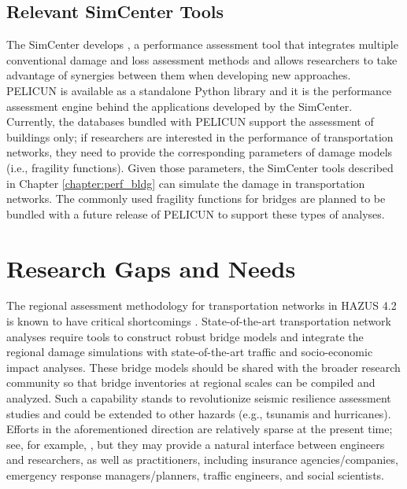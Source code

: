 \subsection{Relevant SimCenter Tools}

The SimCenter develops , a performance assessment tool that integrates multiple conventional damage and loss assessment methods and allows researchers to take advantage of synergies between them when developing new approaches. PELICUN is available as a standalone Python library and it is the performance assessment engine behind the applications developed by the SimCenter. Currently, the databases bundled with PELICUN support the assessment of buildings only; if researchers are interested in the performance of transportation networks, they need to provide the corresponding parameters of damage models (i.e., fragility functions). Given those parameters, the SimCenter tools described in Chapter \ref{chapter:perf_bldg} can simulate the damage in transportation networks. The commonly used fragility functions for bridges are planned to be bundled with a future release of PELICUN to support these types of analyses.

\section{Research Gaps and Needs}
\label{sec:perf_transport_gaps}

The regional assessment methodology for transportation networks in HAZUS 4.2 is known to have critical shortcomings \citep[e.g.][]{mangalathu2017bridge}. State-of-the-art transportation network analyses require tools to construct robust bridge models and integrate the regional damage simulations with state-of-the-art traffic and socio-economic impact analyses. These bridge models should be shared with the broader research community so that bridge inventories at regional scales can be compiled and analyzed. Such a capability stands to revolutionize seismic resilience assessment studies and could be extended to other hazards (e.g., tsunamis and hurricanes). Efforts in the aforementioned direction are relatively sparse at the present time; see, for example, \citet{koc2020comprehensive}, but they may provide a natural interface between engineers and researchers, as well as practitioners, including insurance agencies/companies, emergency response managers/planners, traffic engineers, and social scientists. 

